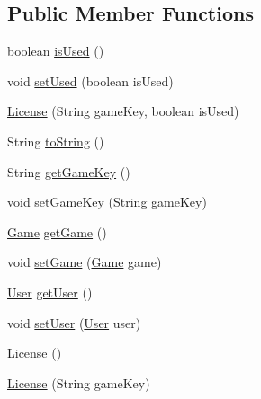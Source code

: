 \subsection*{Public Member Functions}
\begin{DoxyCompactItemize}
\item 
boolean \hyperlink{classes_1_1deusto_1_1server_1_1db_1_1data_1_1_license_aac909623c11f10a457f8b7511145036a}{is\+Used} ()
\item 
void \hyperlink{classes_1_1deusto_1_1server_1_1db_1_1data_1_1_license_aa06731eb1852041fbd788167f6ada563}{set\+Used} (boolean is\+Used)
\item 
\hyperlink{classes_1_1deusto_1_1server_1_1db_1_1data_1_1_license_a05e9d989bae846f70399599c4b85ebcc}{License} (String game\+Key, boolean is\+Used)
\item 
String \hyperlink{classes_1_1deusto_1_1server_1_1db_1_1data_1_1_license_ae8d930f46f5336bb3478d26ef95c578e}{to\+String} ()
\item 
String \hyperlink{classes_1_1deusto_1_1server_1_1db_1_1data_1_1_license_a2ca537ce43b9036ccff6626fe70205bc}{get\+Game\+Key} ()
\item 
void \hyperlink{classes_1_1deusto_1_1server_1_1db_1_1data_1_1_license_a985a3635a2a29f961610cdd615af09a8}{set\+Game\+Key} (String game\+Key)
\item 
\hyperlink{classes_1_1deusto_1_1server_1_1db_1_1data_1_1_game}{Game} \hyperlink{classes_1_1deusto_1_1server_1_1db_1_1data_1_1_license_a38c4c66098bc5faa947cd6599fc7f90f}{get\+Game} ()
\item 
void \hyperlink{classes_1_1deusto_1_1server_1_1db_1_1data_1_1_license_ab3173591006e39649097242e4a1045cb}{set\+Game} (\hyperlink{classes_1_1deusto_1_1server_1_1db_1_1data_1_1_game}{Game} game)
\item 
\hyperlink{classes_1_1deusto_1_1server_1_1db_1_1data_1_1_user}{User} \hyperlink{classes_1_1deusto_1_1server_1_1db_1_1data_1_1_license_aa7a9c7a2a5c6b4663746ed3e8ccaf0a1}{get\+User} ()
\item 
void \hyperlink{classes_1_1deusto_1_1server_1_1db_1_1data_1_1_license_a3ca25ef2a8e0d28af263d67f3d41e893}{set\+User} (\hyperlink{classes_1_1deusto_1_1server_1_1db_1_1data_1_1_user}{User} user)
\item 
\hyperlink{classes_1_1deusto_1_1server_1_1db_1_1data_1_1_license_a04cc0162975b538f1cf4c5ca550be7e9}{License} ()
\item 
\hyperlink{classes_1_1deusto_1_1server_1_1db_1_1data_1_1_license_acc02ae536a7b91b4055271fc93ca8957}{License} (String game\+Key)
\end{DoxyCompactItemize}


